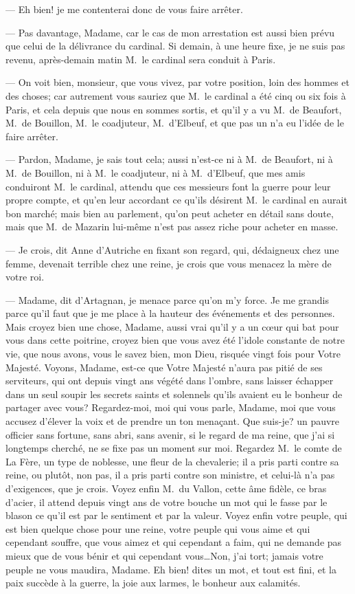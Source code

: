 — Eh bien! je me contenterai donc de vous faire arrêter.

— Pas davantage, Madame, car le cas de mon arrestation est aussi bien prévu que celui de la délivrance du cardinal. Si demain, à une heure fixe, je ne suis pas revenu, après-demain matin M.~le cardinal sera conduit à Paris.

— On voit bien, monsieur, que vous vivez, par votre position, loin des hommes et des choses; car autrement vous sauriez que M.~le cardinal a été cinq ou six fois à Paris, et cela depuis que nous en sommes sortis, et qu'il y a vu M.~de Beaufort, M.~de Bouillon, M.~le coadjuteur, M.~d'Elbeuf, et que pas un n'a eu l'idée de le faire arrêter.

— Pardon, Madame, je sais tout cela; aussi n'est-ce ni à M.~de Beaufort, ni à M.~de Bouillon, ni à M.~le coadjuteur, ni à M.~d'Elbeuf, que mes amis conduiront M.~le cardinal, attendu que ces messieurs font la guerre pour leur propre compte, et qu'en leur accordant ce qu'ils désirent M.~le cardinal en aurait bon marché; mais bien au parlement, qu'on peut acheter en détail sans doute, mais que M.~de Mazarin lui-même n'est pas assez riche pour acheter en masse.

— Je crois, dit Anne d'Autriche en fixant son regard, qui, dédaigneux chez une femme, devenait terrible chez une reine, je crois que vous menacez la mère de votre roi.

— Madame, dit d'Artagnan, je menace parce qu'on m'y force. Je me grandis parce qu'il faut que je me place à la hauteur des événements et des personnes. Mais croyez bien une chose, Madame, aussi vrai qu'il y a un cœur qui bat pour vous dans cette poitrine, croyez bien que vous avez été l'idole constante de notre vie, que nous avons, vous le savez bien, mon Dieu, risquée vingt fois pour Votre Majesté. Voyons, Madame, est-ce que Votre Majesté n'aura pas pitié de ses serviteurs, qui ont depuis vingt ans végété dans l'ombre, sans laisser échapper dans un seul soupir les secrets saints et solennels qu'ils avaient eu le bonheur de partager avec vous? Regardez-moi, moi qui vous parle, Madame, moi que vous accusez d'élever la voix et de prendre un ton menaçant. Que suis-je? un pauvre officier sans fortune, sans abri, sans avenir, si le regard de ma reine, que j'ai si longtemps cherché, ne se fixe pas un moment sur moi. Regardez M.~le comte de La Fère, un type de noblesse, une fleur de la chevalerie; il a pris parti contre sa reine, ou plutôt, non pas, il a pris parti contre son ministre, et celui-là n'a pas d'exigences, que je crois. Voyez enfin M.~du Vallon, cette âme fidèle, ce bras d'acier, il attend depuis vingt ans de votre bouche un mot qui le fasse par le blason ce qu'il est par le sentiment et par la valeur. Voyez enfin votre peuple, qui est bien quelque chose pour une reine, votre peuple qui vous aime et qui cependant souffre, que vous aimez et qui cependant a faim, qui ne demande pas mieux que de vous bénir et qui cependant vous\dots Non, j'ai tort; jamais votre peuple ne vous maudira, Madame. Eh bien! dites un mot, et tout est fini, et la paix succède à la guerre, la joie aux larmes, le bonheur aux calamités.

